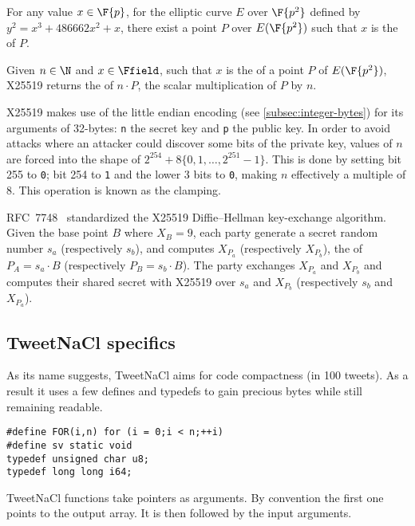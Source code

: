 For any value $x \in \F{p}$, for the elliptic curve $E$ over $\F{p^2}$
defined by $y^2 = x^3 + 486662 x^2 + x$, there exist a point $P$ over $E(\F{p^2})$
such that $x$ is the \xcoord of $P$.

Given $n \in \N$ and $x \in \Ffield$, such that $x$ is the \xcoord of
a point $P$ of $E(\F{p^2})$, X25519 returns the \xcoord of $n \cdot P$, the
scalar multiplication of $P$ by $n$.

X25519 makes use of the little endian encoding (see \ref{subsec:integer-bytes})
for its arguments of 32-bytes:
\texttt{n} the secret key and \texttt{p} the public key.
In order to avoid attacks where an attacker could discover some bits of the
private key, values of $n$ are forced into the shape of
$2^{254} + 8\{0,1,\ldots,2^{251}-1\}$. This is done by setting bit 255
to \texttt{0}; bit 254 to \texttt{1} and the lower 3 bits to \texttt{0},
making $n$ effectively a multiple of 8. This operation is known as the clamping.

RFC~7748~\cite{rfc7748} standardized the X25519 Diffie–Hellman key-exchange algorithm.
Given the base point $B$ where $X_B=9$, each party generate a secret random number
$s_a$ (respectively $s_b$), and computes $X_{P_a}$ (respectively $X_{P_b}$), the
\xcoord of $P_A = s_a \cdot B$ (respectively $P_B = s_b \cdot B$).
The party exchanges $X_{P_a}$ and $X_{P_b}$ and computes their shared secret with X25519
over $s_a$ and $X_{P_b}$ (respectively $s_b$ and $X_{P_a}$).





\subsection{TweetNaCl specifics}
\label{subsec:Number-TweetNaCl}

As its name suggests, TweetNaCl aims for code compactness (in 100 tweets).
As a result it uses a few defines and typedefs to gain precious bytes while
still remaining readable.
\begin{lstlisting}[language=Ctweetnacl]
#define FOR(i,n) for (i = 0;i < n;++i)
#define sv static void
typedef unsigned char u8;
typedef long long i64;
\end{lstlisting}

TweetNaCl functions take pointers as arguments. By convention the first one
points to the output array. It is then followed by the input arguments.

